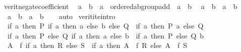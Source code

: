 \begin{isabellebody}
\ verit{\isacharunderscore}{\kern0pt}negate{\isacharunderscore}{\kern0pt}coefficient{\isacharcolon}{\kern0pt}\isanewline
\ \ {\isacartoucheopen}a\ {\isasymle}\ {\isacharparenleft}{\kern0pt}b\ {\isacharcolon}{\kern0pt}{\isacharcolon}{\kern0pt}\ {\isacharprime}{\kern0pt}a\ {\isacharcolon}{\kern0pt}{\isacharcolon}{\kern0pt}\ {\isacharbraceleft}{\kern0pt}ordered{\isacharunderscore}{\kern0pt}ab{\isacharunderscore}{\kern0pt}group{\isacharunderscore}{\kern0pt}add{\isacharbraceright}{\kern0pt}{\isacharparenright}{\kern0pt}\ {\isasymLongrightarrow}\ {\isacharminus}{\kern0pt}a\ {\isasymge}\ {\isacharminus}{\kern0pt}b{\isacartoucheclose}\isanewline
\ \ {\isacartoucheopen}a\ {\isacharless}{\kern0pt}\ b\ {\isasymLongrightarrow}\ {\isacharminus}{\kern0pt}a\ {\isachargreater}{\kern0pt}\ {\isacharminus}{\kern0pt}b{\isacartoucheclose}\isanewline
\ \ {\isacartoucheopen}a\ {\isacharequal}{\kern0pt}\ b\ {\isasymLongrightarrow}\ {\isacharminus}{\kern0pt}a\ {\isacharequal}{\kern0pt}\ {\isacharminus}{\kern0pt}b{\isacartoucheclose}\isanewline
%
\isadelimproof
\ \ %
\endisadelimproof
%
\isatagproof
{}\isamarkupfalse%
\ auto%
\endisatagproof
{\isafoldproof}%
%
\isadelimproof
\isanewline
%
\endisadelimproof
\isanewline
{}\isamarkupfalse%
\isanewline
\isanewline
{}\isamarkupfalse%
\ verit{\isacharunderscore}{\kern0pt}ite{\isacharunderscore}{\kern0pt}intro{\isacharcolon}{\kern0pt}\isanewline
\ \ {\isacartoucheopen}{\isacharparenleft}{\kern0pt}if\ a\ then\ P\ {\isacharparenleft}{\kern0pt}if\ a\ then\ a{\isacharprime}{\kern0pt}\ else\ b{\isacharprime}{\kern0pt}{\isacharparenright}{\kern0pt}\ else\ Q{\isacharparenright}{\kern0pt}\ {\isasymlongleftrightarrow}\ {\isacharparenleft}{\kern0pt}if\ a\ then\ P\ a{\isacharprime}{\kern0pt}\ else\ Q{\isacharparenright}{\kern0pt}{\isacartoucheclose}\isanewline
\ \ {\isacartoucheopen}{\isacharparenleft}{\kern0pt}if\ a\ then\ P{\isacharprime}{\kern0pt}\ else\ Q{\isacharprime}{\kern0pt}\ {\isacharparenleft}{\kern0pt}if\ a\ then\ a{\isacharprime}{\kern0pt}\ else\ b{\isacharprime}{\kern0pt}{\isacharparenright}{\kern0pt}{\isacharparenright}{\kern0pt}\ {\isasymlongleftrightarrow}\ {\isacharparenleft}{\kern0pt}if\ a\ then\ P{\isacharprime}{\kern0pt}\ else\ Q{\isacharprime}{\kern0pt}\ b{\isacharprime}{\kern0pt}{\isacharparenright}{\kern0pt}{\isacartoucheclose}\isanewline
\ \ {\isacartoucheopen}A\ {\isacharequal}{\kern0pt}\ f\ {\isacharparenleft}{\kern0pt}if\ a\ then\ R\ else\ S{\isacharparenright}{\kern0pt}\ {\isasymlongleftrightarrow}\ {\isacharparenleft}{\kern0pt}if\ a\ then\ A\ {\isacharequal}{\kern0pt}\ f\ R\ else\ A\ {\isacharequal}{\kern0pt}\ f\ S{\isacharparenright}{\kern0pt}{\isacartoucheclose}\isanewline

\end{isabellebody}
